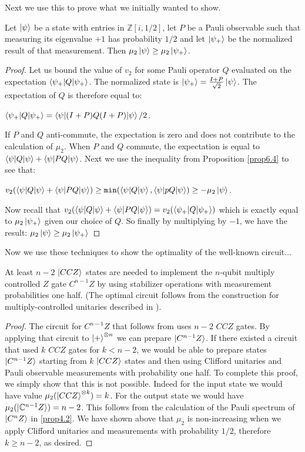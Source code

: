 \documentclass[12pt]{dalthesis}
\begin{document}
Next we use this to prove what we initially wanted to show.
\begin{proposition}
Let $\ket{\psi}$ be a state with entries in $\mathbb{Z}[i, 1/2]$, let $P$ be a Pauli observable such that measuring its eigenvalue $+1$ has probability $1/2$ and let $\ket{\psi_+}$ be the normalized result of that measurement. Then $\mu_2\ket{\psi} \geq \mu_2\ket{\psi_+}$. 
\end{proposition}
\begin{proof}
Let us bound the value of $v_2$ for some Pauli operator $Q$ evaluated on the expectation $\braket{\psi_+ | Q |\psi_+}$. The normalized state is $\ket{\psi_+} = \frac{I + P}{\sqrt{2}}\ket{\psi}$. The expectation of $Q$ is therefore equal to:
\begin{center}
$\braket{\psi_+ | Q |\psi_+} = \braket{\psi | (I + P)Q(I + P) | \psi}/2$.
\end{center}
If $P$ and $Q$ anti-commute, the expectation is zero and does not contribute to the calculation of $\mu_2$. When $P$ and $Q$ commute, the expectation is equal to $\braket{\psi | Q | \psi} + \braket{\psi |PQ |\psi}$. Next we use the inequality from Proposition \ref{prop6.4} to see that:
\begin{center}
$v_2(\braket{\psi |Q| \psi} + \braket{\psi |PQ| \psi}) \geq \texttt{min}(\braket{\psi |Q|\psi}, \braket{\psi |pQ|\psi}) \geq -\mu_2\ket{\psi}$.
\end{center}
Now recall that $v_2(\braket{\psi |Q| \psi} + \braket{\psi |PQ| \psi}) = v_2(\braket{\psi_+ |Q| \psi_+})$ which is exactly equal to $\mu_2\ket{\psi_+}$ given our choice of $Q$. So finally by multiplying by $-1$, we have the result: $\mu_2\ket{\psi} \geq \mu_2\ket{\psi_+}$
\end{proof}

Now we use these techniques to show the optimality of the well-known circuit...

\begin{lemma}
At least $n-2$ $\ket{CCZ}$ states are needed to implement the $n$-qubit multiply controlled $Z$ gate $C^{n-1}Z$ by using stabilizer operations with measurement probabilities one half. (The optimal circuit follows from the construction for multiply-controlled unitaries described in \cite{}).
\end{lemma}
\begin{proof}
The circuit for $C^{n-1}Z$ that follows from \cite{} uses $n-2$ $CCZ$ gates. By applying that circuit to $\ket{+}^{\otimes n}$ we can prepare $\ket{C^{n-1}Z}$. If there existed a circuit that used $k$ $CCZ$ gates for $k < n-2$, we would be able to prepare states $\ket{C^{n-1}Z}$ starting from $k$ $\ket{CCZ}$ states and then using Clifford unitaries and Pauli observable measurements with probability one half. To complete this proof, we simply show that this is not possible. Indeed for the input state we would have value $\mu_2 (\ket{CCZ}^{\otimes k}) = k$. For the output state we would have $\mu_2 (\ket{\mathbb{C}^{n-1}Z}) = n-2$. This follows from the calculation of the Pauli spectrum of $\ket{C^nZ}$ in \ref{prop4.2}. We have shown above that $\mu_2$ is non-increasing when we apply Clifford unitaries and measurements with probability $1/2$, therefore $k \geq n-2$, as desired.
\end{proof}
\end{document}
